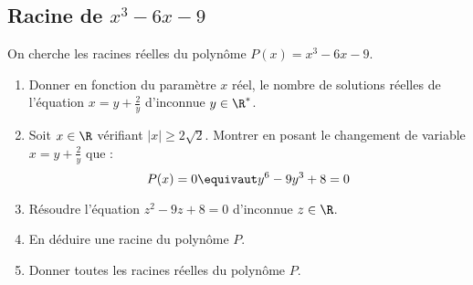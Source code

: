 \subsection{Racine de $x^3-6x-9$}

\begin{exercice}
On cherche les racines réelles du polynôme $P(x) =x^3-6x-9$. 
\begin{enumerate}
\item Donner en fonction du paramètre $x$ réel, le nombre de solutions réelles de l'équation $x=y+\frac{2}{y}$ d'inconnue $y\in \R^*$. 
\item Soit $x\in \R$ vérifiant $|x|\geq 2\sqrt{2}$. Montrer en posant le changement de variable $x=y+\frac{2}{y}$ que : 
$$ P(x) =0 \equivaut y^6 -9y^3 +8=0$$
\item Résoudre l'équation $z^2-9z+8=0$ d'inconnue $z\in \R$. 
\item En déduire une racine du polynôme $P$.
\item Donner toutes les racines réelles du polynôme $P$. 
\end{enumerate}
\end{exercice}

